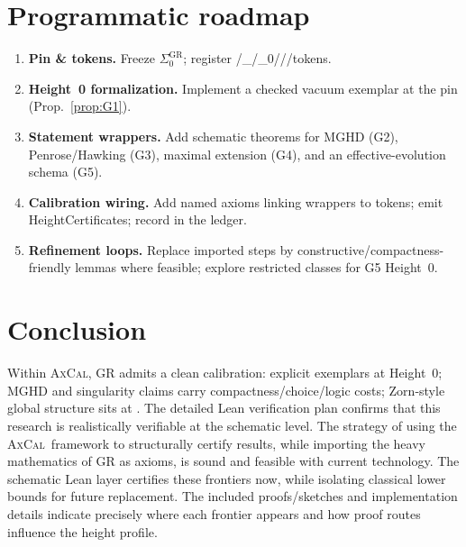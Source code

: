 \documentclass[11pt]{article}
\theoremstyle{definition}
\theoremstyle{remark}
\newcommand{\WLPO}{\mathrm{WLPO}}
\newcommand{\LEM}{\mathrm{LEM}}
\newcommand{\FT}{\mathrm{FT}}
\newcommand{\WKLz}{\mathrm{WKL}_0}
\newcommand{\AC}{\mathrm{AC}}
\newcommand{\DCw}{\mathrm{DC}_\omega}
\newcommand{\SigmaZero}{\Sigma_{0}}
\newcommand{\AxCal}{\textsc{AxCal}}
\begin{document}
\section{Programmatic roadmap}
\begin{enumerate}
\item \textbf{Pin \& tokens.} Freeze $\SigmaZero^{\mathrm{GR}}$; register \AC/\DCw/\WKLz/\FT/\LEM/\WLPO tokens.
\item \textbf{Height~0 formalization.} Implement a checked vacuum exemplar at the pin (Prop.~\ref{prop:G1}).
\item \textbf{Statement wrappers.} Add schematic theorems for MGHD (G2), Penrose/Hawking (G3), maximal extension (G4), and an effective-evolution schema (G5).
\item \textbf{Calibration wiring.} Add named axioms linking wrappers to tokens; emit HeightCertificates; record in the ledger.
\item \textbf{Refinement loops.} Replace imported steps by constructive/compactness-friendly lemmas where feasible; explore restricted classes for G5 Height~0.
\end{enumerate}

\section{Conclusion}
Within \AxCal, GR admits a clean calibration: explicit exemplars at Height~0; MGHD and singularity claims carry compactness/choice/logic costs; Zorn-style global structure sits at \AC. The detailed Lean verification plan confirms that this research is realistically verifiable at the schematic level. The strategy of using the \AxCal\ framework to structurally certify results, while importing the heavy mathematics of GR as axioms, is sound and feasible with current technology. The schematic Lean layer certifies these frontiers now, while isolating classical lower bounds for future replacement. The included proofs/sketches and implementation details indicate precisely where each frontier appears and how proof routes influence the height profile.
\end{document}
